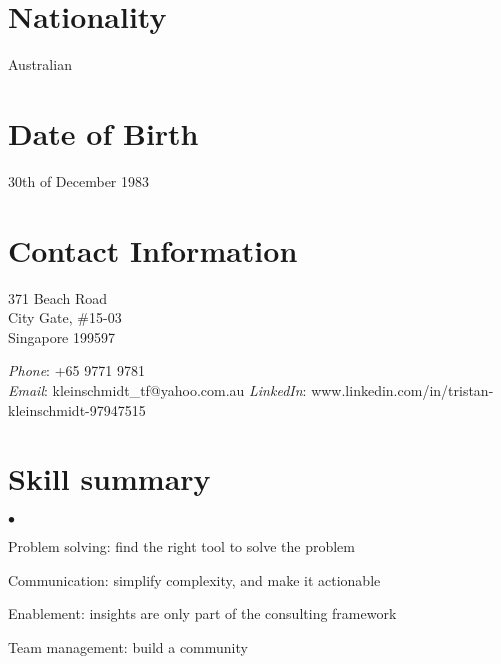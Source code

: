 \documentclass[margin,line]{resume}
\newenvironment{list2}{
  \begin{list}{$\bullet$}{%
      \setlength{\itemsep}{0in}
      \setlength{\parsep}{0in} \setlength{\parskip}{0in}
      \setlength{\topsep}{0in} \setlength{\partopsep}{0in}
      \setlength{\leftmargin}{0.2in}}}{\end{list}}
\begin{document}
\begin{resume}

\section{\sc Nationality}
Australian

\section{\sc Date of Birth}
30th of December 1983

\section{\sc Contact Information}

\parbox[t]{3.3in}{%
371 Beach Road\\
City Gate, \#15-03\\
Singapore 199597}
\parbox[t]{2.3in}{%
{\it Phone}: {+65 9771 9781}  \\
{\it Email}: {kleinschmidt\_tf@yahoo.com.au}
{\it LinkedIn}: {www.linkedin.com/in/tristan-kleinschmidt-97947515}
}


\section{\sc Skill summary}
\begin{list2}
\item Problem solving: find the right tool to solve the problem
\item Communication: simplify complexity, and make it actionable
\item Enablement: insights are only part of the consulting framework
\item Team management: build a community
\end{list2}


\end{resume}
\end{document}
